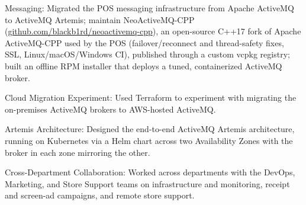 \begin{cventries}
{\begin{cvitems}
      \item {Messaging: Migrated the POS messaging infrastructure from Apache ActiveMQ to ActiveMQ Artemis; maintain NeoActiveMQ-CPP (\href{https://github.com/blackb1rd/neoactivemq-cpp}{github.com/blackb1rd/neoactivemq-cpp}), an open-source C++17 fork of Apache ActiveMQ-CPP used by the POS (failover/reconnect and thread-safety fixes, SSL, Linux/macOS/Windows CI), published through a custom vcpkg registry; built an offline RPM installer that deploys a tuned, containerized ActiveMQ broker.}
      \item {Cloud Migration Experiment: Used Terraform to experiment with migrating the on-premises ActiveMQ brokers to AWS-hosted ActiveMQ.}
      \item {Artemis Architecture: Designed the end-to-end ActiveMQ Artemis architecture, running on Kubernetes via a Helm chart across two Availability Zones with the broker in each zone mirroring the other.}
      \item {Cross-Department Collaboration: Worked across departments with the DevOps, Marketing, and Store Support teams on infrastructure and monitoring, receipt and screen-ad campaigns, and remote store support.}
      \end{cvitems}
    }


\end{cventries}
